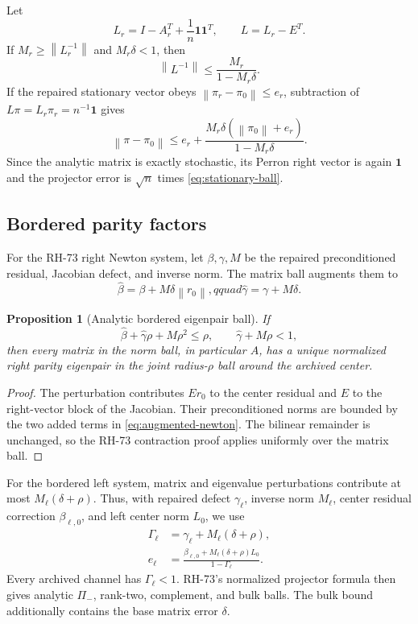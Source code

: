 \documentclass[11pt]{article}
\newtheorem{proposition}[theorem]{Proposition}
\theoremstyle{definition}
\newcommand{\norm}[1]{\left\lVert#1\right\rVert}
\begin{document}
Let
\[
 L_r=I-A_r^T+\frac1n\mathbf1\mathbf1^T,
 \qquad L=L_r-E^T.
\]
If $M_r\ge\norm{L_r^{-1}}$ and $M_r\delta<1$, then
\begin{equation}
 \norm{L^{-1}}
 \le\frac{M_r}{1-M_r\delta}.
 \label{eq:stationary-transfer}
\end{equation}
If the repaired stationary vector obeys
$\norm{\pi_r-\pi_0}\le e_r$, subtraction of $L\pi=L_r\pi_r=n^{-1}\mathbf1$
gives
\begin{equation}
 \norm{\pi-\pi_0}
 \le e_r+
 \frac{M_r\delta(\norm{\pi_0}+e_r)}{1-M_r\delta}.
 \label{eq:stationary-ball}
\end{equation}
Since the analytic matrix is exactly stochastic, its Perron right vector is
again $\mathbf1$ and the projector error is $\sqrt n$ times
\eqref{eq:stationary-ball}.

\subsection{Bordered parity factors}

For the RH-73 right Newton system, let $\beta,\gamma,M$ be the repaired
preconditioned residual, Jacobian defect, and inverse norm.  The matrix ball
augments them to
\begin{equation}
 \widehat\beta=\beta+M\delta\norm{r_0},qquad
 \widehat\gamma=\gamma+M\delta.
 \label{eq:augmented-newton}
\end{equation}

\begin{proposition}[Analytic bordered eigenpair ball]
\label{prop:right}
If
\[
 \widehat\beta+\widehat\gamma\rho+M\rho^2\le\rho,
 \qquad \widehat\gamma+M\rho<1,
\]
then every matrix in the norm ball, in particular $A$, has a unique normalized
right parity eigenpair in the joint radius-$\rho$ ball around the archived
center.
\end{proposition}

\begin{proof}
The perturbation contributes $Er_0$ to the center residual and $E$ to the
right-vector block of the Jacobian.  Their preconditioned norms are bounded by
the two added terms in \eqref{eq:augmented-newton}.  The bilinear remainder is
unchanged, so the RH-73 contraction proof applies uniformly over the matrix
ball.
\end{proof}

For the bordered left system, matrix and eigenvalue perturbations contribute
at most $M_\ell(\delta+\rho)$.  Thus, with repaired defect $\gamma_\ell$,
inverse norm $M_\ell$, center residual correction $\beta_{\ell,0}$, and left
center norm $L_0$, we use
\begin{align}
 \Gamma_\ell&=\gamma_\ell+M_\ell(\delta+\rho),\label{eq:left-defect}\\
 e_\ell&=
 \frac{\beta_{\ell,0}+M_\ell(\delta+\rho)L_0}{1-\Gamma_\ell}.
 \label{eq:left-ball}
\end{align}
Every archived channel has $\Gamma_\ell<1$.  RH-73's normalized projector
formula then gives analytic $\Pi_-$, rank-two, complement, and bulk balls.  The
bulk bound additionally contains the base matrix error $\delta$.
\end{document}
